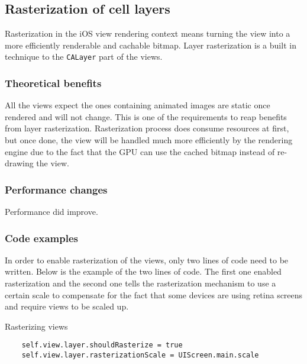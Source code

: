 \documentclass[a4paper,12pt]{article}
\begin{document}
\subsection{Rasterization of cell layers}
Rasterization in the iOS view rendering context means turning the view into a more efficiently renderable and cachable bitmap. Layer rasterization is a built in technique to the \texttt{CALayer} part of the views.

\subsubsection*{Theoretical benefits}
All the views expect the ones containing animated images are static once rendered and will not change. This is one of the requirements to reap benefits from layer rasterization. Rasterization process does consume resources at first, but once done, the view will be handled much more efficiently by the rendering engine due to the fact that the GPU can use the cached bitmap instead of re-drawing the view.\cite{MovingPixelsOntoTheScreen}

\subsubsection*{Performance changes}
Performance did improve.

\subsubsection*{Code examples}
In order to enable rasterization of the views, only two lines of code need to be written. Below is the example of the two lines of code. The first one enabled rasterization and the second one tells the rasterization mechanism to use a certain scale to compensate for the fact that some devices are using retina screens and require views to be scaled up.
\begin{listing}[H]
  \caption{Rasterizing views}
  \begin{verbatim}
    self.view.layer.shouldRasterize = true
    self.view.layer.rasterizationScale = UIScreen.main.scale
  \end{verbatim}
\end{listing}

\end{document}
